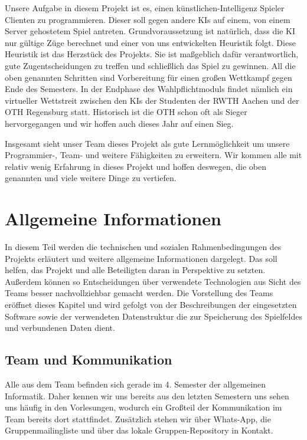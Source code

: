 \documentclass[12pt,a4paper,bibliography=totocnumbered,listof=totocnumbered]{scrartcl}
\begin{document}
    Unsere Aufgabe in diesem Projekt ist es, einen künstlichen-Intelligenz Spieler Clienten zu programmieren. Dieser soll gegen andere KIs auf einem, von einem Server gehostetem Spiel antreten. Grundvoraussetzung ist natürlich, dass die KI nur gültige Züge berechnet und einer von uns entwickelten Heuristik folgt. Diese Heuristik ist das Herzstück des Projekts. Sie ist maßgeblich dafür verantwortlich, gute Zugentscheidungen zu treffen und schließlich das Spiel zu gewinnen. All die oben genannten Schritten sind Vorbereitung für einen großen Wettkampf gegen Ende des Semesters. In der Endphase des Wahlpflichtmoduls findet nämlich ein virtueller Wettstreit zwischen den KIs der Studenten der RWTH Aachen und der OTH Regensburg statt. Historisch ist die OTH schon oft als Sieger hervorgegangen und wir hoffen auch dieses Jahr auf einen Sieg.

    Insgesamt sieht unser Team dieses Projekt als gute Lernmöglichkeit um unsere Programmier-, Team- und weitere Fähigkeiten zu erweitern. Wir kommen alle mit relativ wenig Erfahrung in dieses Projekt und hoffen deswegen, die oben genannten und viele weitere Dinge zu vertiefen.

    \newpage
    \section{Allgemeine Informationen}

    In diesem Teil werden die technischen und sozialen Rahmenbedingungen des Projekts erläutert und weitere allgemeine Informationen dargelegt. Das soll helfen, das Projekt und alle Beteiligten daran in Perspektive zu setzten. Außerdem können so Entscheidungen über verwendete Technologien aus Sicht des Teams besser nachvollziehbar gemacht werden. Die Vorstellung des Teams eröffnet dieses Kapitel und wird gefolgt von der Beschreibungen der eingesetzten Software sowie der verwendeten Datenstruktur die zur Speicherung des Spielfeldes und verbundenen Daten dient.

    \subsection{Team und Kommunikation}
    Alle aus dem Team befinden sich gerade im 4. Semester der allgemeinen Informatik. Daher kennen wir uns bereits aus den letzten Semestern uns sehen uns häufig in den Vorlesungen, wodurch ein Großteil der Kommunikation im Team bereits dort stattfindet. Zusätzlich stehen wir über Whats-App, die Gruppenmailingliste und über das lokale Gruppen-Repository in Kontakt.
\end{document}
